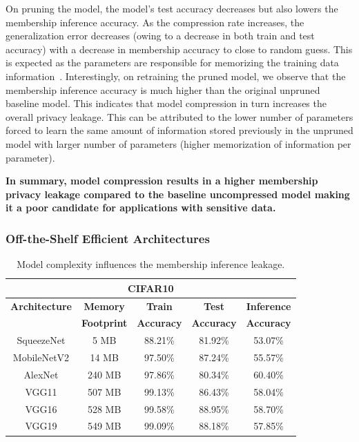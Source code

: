 On pruning the model, the model's test accuracy decreases but also lowers the membership inference accuracy. %
As the compression rate increases, the generalization error decreases (owing to a decrease in both train and test accuracy) with a decrease in membership accuracy to close to random guess.
This is expected as the parameters are responsible for memorizing the training data information~\cite{DBLP:journals/corr/abs-1812-00910,236216,10.1145/3133956.3134077}. %
Interestingly, on retraining the pruned model, we observe that the membership inference accuracy is much higher than the original unpruned baseline model.
This indicates that model compression in turn increases the overall privacy leakage.
This can be attributed to the lower number of parameters forced to learn the same amount of information stored previously in the unpruned model with larger number of parameters (higher memorization of information per parameter).

\textbf{In summary, model compression results in a higher membership privacy leakage compared to the baseline uncompressed model making it a poor candidate for applications with sensitive data.}






\subsubsection{Off-the-Shelf Efficient Architectures}


\begin{table}[h]
\begin{center}
\renewcommand\arraystretch{1.5}
\fontsize{6.5pt}{6.5pt}\selectfont
\begin{tabular}{|c|c|c|c|c|}
\hline
\multicolumn{5}{|c|}{\textbf{CIFAR10}}\\
\hline
\textbf{Architecture} & \textbf{Memory} & \textbf{Train}  & \textbf{Test}  & \textbf{Inference}   \\
 & \textbf{Footprint} & \textbf{Accuracy} & \textbf{Accuracy} & \textbf{Accuracy}  \\
\hline
SqueezeNet & 5 MB & 88.21\% & 81.92\% & \cellcolor{green!25}53.07\% \\
MobileNetV2 & 14 MB & 97.50\% & 87.24\% & \cellcolor{green!25}55.57\% \\
\hline
AlexNet & 240 MB & 97.86\% & 80.34\% & \cellcolor{red!25}60.40\% \\
VGG11 & 507 MB & 99.13\% & 86.43\% & \cellcolor{red!25}58.04\% \\
VGG16 & 528 MB & 99.58\% & 88.95\% & \cellcolor{red!25}58.70\%  \\
VGG19 & 549 MB & 99.09\% & 88.18\% & \cellcolor{red!25}57.85\% \\
\hline
\end{tabular}
\end{center}
\caption{Model complexity influences the membership inference leakage.}
\label{stdarch}
\vspace{-0mm}
\end{table}

